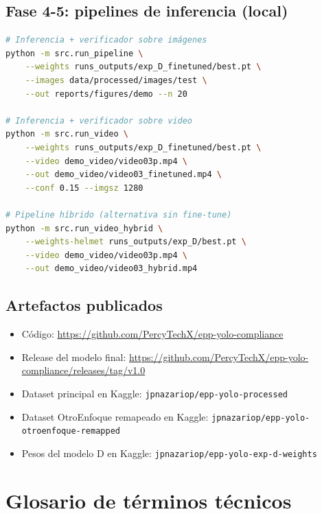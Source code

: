 \documentclass[11pt,a4paper]{article}
\begin{document}
\subsection{Fase 4-5: pipelines de inferencia (local)}

\begin{lstlisting}[language=bash, basicstyle=\ttfamily\scriptsize]
# Inferencia + verificador sobre imágenes
python -m src.run_pipeline \
    --weights runs_outputs/exp_D_finetuned/best.pt \
    --images data/processed/images/test \
    --out reports/figures/demo --n 20

# Inferencia + verificador sobre video
python -m src.run_video \
    --weights runs_outputs/exp_D_finetuned/best.pt \
    --video demo_video/video03p.mp4 \
    --out demo_video/video03_finetuned.mp4 \
    --conf 0.15 --imgsz 1280

# Pipeline híbrido (alternativa sin fine-tune)
python -m src.run_video_hybrid \
    --weights-helmet runs_outputs/exp_D/best.pt \
    --video demo_video/video03p.mp4 \
    --out demo_video/video03_hybrid.mp4
\end{lstlisting}

\subsection{Artefactos publicados}

\begin{itemize}[leftmargin=*]
    \item Código:
    \url{https://github.com/PercyTechX/epp-yolo-compliance}
    \item Release del modelo final:
    \url{https://github.com/PercyTechX/epp-yolo-compliance/releases/tag/v1.0}
    \item Dataset principal en Kaggle:
    \texttt{jpnazariop/epp-yolo-processed}
    \item Dataset OtroEnfoque remapeado en Kaggle:
    \texttt{jpnazariop/epp-yolo-otroenfoque-remapped}
    \item Pesos del modelo D en Kaggle:
    \texttt{jpnazariop/epp-yolo-exp-d-weights}
\end{itemize}

\section{Glosario de términos técnicos}
\end{document}
